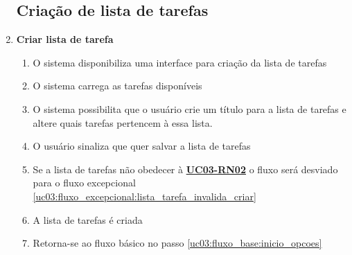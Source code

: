 \documentclass[
	12pt,				%
	oneside,			%
	a4paper,			%
	english,			%
	brazil,				%
	]{abntex2}
\begin{document}
\begin{enumerate}[label=\textbf{UC03-FA{\arabic*}},font=\normalsize]
    \subsection{Criação de lista de tarefas}
    \item \textbf{\normalsize Criar lista de tarefa}
    \label{uc03:fluxo_alternativo:criar_lista_tarefa}
    \begin{enumerate}[label={\arabic*}.]
        \item O sistema disponibiliza uma interface para criação da lista de tarefas
        \item O sistema carrega as tarefas disponíveis
        \item O sistema possibilita que o usuário crie um título para a lista de tarefas e altere quais tarefas pertencem à essa lista. \label{uc03:fluxo_alternativo:criar_lista_tarefa:inicio_interacao}
        \item O usuário sinaliza que quer salvar a lista de tarefas
        \item Se a lista de tarefas não obedecer à \textbf{\hyperref[uc03:rn02_validar_lista_tarefa]{UC03-RN02}} o fluxo será desviado para o fluxo excepcional \ref{uc03:fluxo_excepcional:lista_tarefa_invalida_criar}
        \item A lista de tarefas é criada
        \item Retorna-se ao fluxo básico no passo \ref{uc03:fluxo_base:inicio_opcoes}
    \end{enumerate}
    

\end{enumerate}
\end{document}
